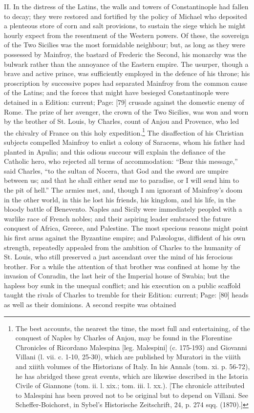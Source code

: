 II. In the distress of the Latins, the walls and towers of Constantinople had fallen to decay; they were restored and fortified by the policy of Michael who deposited a plenteous store of corn and salt provisions, to sustain the siege which he might hourly expect from the resentment of the Western powers. Of these, the sovereign of the Two Sicilies was the most formidable neighbour; but, as long as they were possessed by Mainfroy, the bastard of Frederic the Second, his monarchy was the bulwark rather than the annoyance of the Eastern empire. The usurper, though a brave and active prince, was sufficiently employed in the defence of his throne; his proscription by successive popes had separated Mainfroy from the common cause of the Latins; and the forces that might have besieged Constantinople were detained in a Edition: current; Page: [79] crusade against the domestic enemy of Rome. The prize of her avenger, the crown of the Two Sicilies, was won and worn by the brother of St. Louis, by Charles, count of Anjou and Provence, who led the chivalry of France on this holy expedition.\footnote{The best accounts, the nearest the time, the most full and entertaining, of the conquest of Naples by Charles of Anjou, may be found in the Florentine Chronicles of Ricordano Malespina [leg. Malespini] (c. 175-193) and Giovanni Villani (l. vii. c. 1-10, 25-30), which are published by Muratori in the viiith and xiiith volumes of the Historians of Italy. In his Annals (tom. xi. p. 56-72), he has abridged these great events, which are likewise described in the Istoria Civile of Giannone (tom. ii. l. xix.; tom. iii. l. xx.). [The chronicle attributed to Malespini has been proved not to be original but to depend on Villani. See Scheffer-Boichorst, in Sybel\texthebrew{}’s Historische Zeitschrift, 24, p. 274 sqq. (1870).]} The disaffection of his Christian subjects compelled Mainfroy to enlist a colony of Saracens, whom his father had planted in Apulia; and this odious succour will explain the defiance of the Catholic hero, who rejected all terms of accommodation: \texthebrew{“}Bear this message,\texthebrew{}” said Charles, \texthebrew{“}to the sultan of Nocera, that God and the sword are umpire between us; and that he shall either send me to paradise, or I will send him to the pit of hell.\texthebrew{}” The armies met, and, though I am ignorant of Mainfroy\texthebrew{}’s doom in the other world, in this he lost his friends, his kingdom, and his life, in the bloody battle of Benevento. Naples and Sicily were immediately peopled with a warlike race of French nobles; and their aspiring leader embraced the future conquest of Africa, Greece, and Palestine. The most specious reasons might point his first arms against the Byzantine empire; and Palæologus, diffident of his own strength, repeatedly appealed from the ambition of Charles to the humanity of St. Louis, who still preserved a just ascendant over the mind of his ferocious brother. For a while the attention of that brother was confined at home by the invasion of Conradin, the last heir of the Imperial house of Swabia; but the hapless boy sunk in the unequal conflict; and his execution on a public scaffold taught the rivals of Charles to tremble for their Edition: current; Page: [80] heads as well as their dominions. A second respite was obtained 